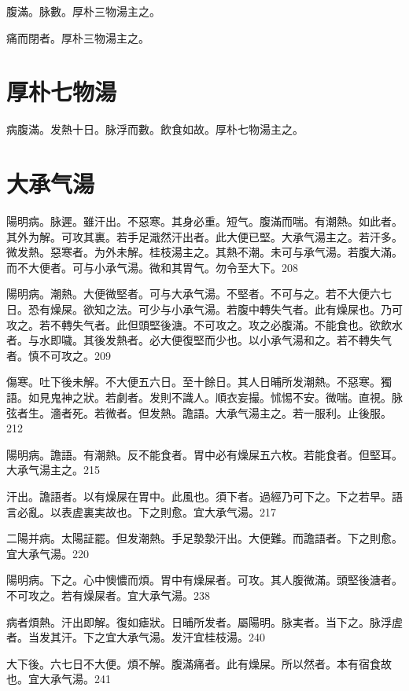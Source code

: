 腹滿。脉數。厚朴三物湯主之。{\wuben}

痛而閉者。厚朴三物湯主之。{\dengben}

\section{厚朴七物湯}

病腹滿。发熱十日。脉浮而數。飲食如故。厚朴七物湯主之。

\section{大承气湯}

陽明病。脉遲。雖汗出。不惡寒。其身必重。短气。腹滿而喘。有潮熱。如此者。其外为解。可攻其裏。若手足濈然汗出者。此大便已堅。{\khaaitp 大}承气湯主之。若汗多。微发熱。惡寒者。为外未解。{\khaaitp 桂枝湯主之。}其熱不潮。未可与承气湯。若腹大滿。而不大便者。可与小承气湯。微和其胃气。勿令至大下。208

陽明病。潮熱。大便微堅者。可与{\khaaitp 大}承气湯。不堅者。不可与之。若不大便六七日。恐有燥屎。欲知之法。可少与小承气湯。若腹中轉失气者。此有燥屎也。乃可攻之。若不轉失气者。此但頭堅後溏。不可攻之。攻之必腹滿。不能食也。欲飲水者。与水即噦。其後发熱者。必大便復堅而少也。以小承气湯和之。若不轉失气者。慎不可攻之。209

傷寒。吐下後未解。不大便五六日。至十餘日。其人日晡所发潮熱。不惡寒。獨語。如見鬼{\khaaitp 神之}狀。若劇者。发則不識人。順衣妄撮。怵惕不安。微喘。直視。脉弦者生。濇者死。{\khaaitp 若}微者。但发熱。譫語。{\khaaitp 大}承气湯主之。若一服利。止後服。212

陽明病。譫語。有潮熱。反不能食者。{\khaaitp 胃中}必有燥屎五六枚。若能食者。但堅耳。{\khaaitp 大}承气湯主之。215

汗出。譫語者。以有燥屎在胃中。此風也。{\khaaitp 須下者。}過經乃可下之。下之若早。語言必亂。以表虗裏実故也。下之則愈。宜{\khaaitp 大}承气湯。217

二陽并病。太陽証罷。但发潮熱。手足漐漐汗出。大便難。而譫語者。下之則愈。宜{\khaaitp 大}承气湯。220

陽明病。下之。心中懊憹而煩。胃中有燥屎者。可攻。其人腹微滿。頭堅後溏者。不可攻之。若有燥屎者。宜{\khaaitp 大}承气湯。238

病者煩熱。汗出即解。復如瘧狀。日晡所发者。屬陽明。脉実者。当下之。脉浮虗者。当发其汗。下之宜{\khaaitp 大}承气湯。发汗宜桂枝湯。240

大下後。六七日不大便。煩不解。腹滿痛者。此有燥屎。所以然者。本有宿食故也。宜{\khaaitp 大}承气湯。241

